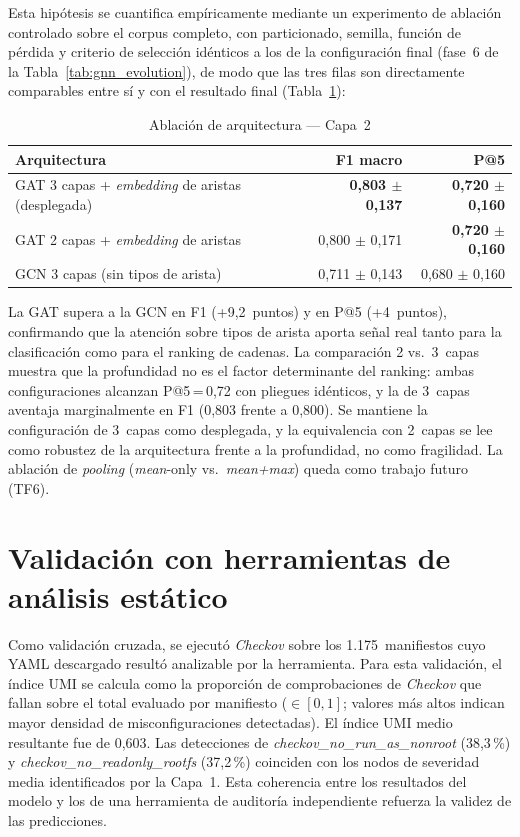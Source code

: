 Esta hipótesis se cuantifica empíricamente mediante un experimento de ablación
controlado sobre el corpus completo, con particionado, semilla, función de
pérdida y criterio de selección idénticos a los de la configuración final
(fase~6 de la Tabla~\ref{tab:gnn_evolution}), de modo que las tres filas son
directamente comparables entre sí y con el resultado final (Tabla~\ref{tab:arch_ablation}):

\begin{table}[htbp]
\centering
\caption{Ablación de arquitectura — Capa~2}
\label{tab:arch_ablation}
\begin{tabular}{@{}lrr@{}}
\toprule
Arquitectura & F1 macro & P@5 \\
\midrule
\ac{GAT} 3 capas + \textit{embedding} de aristas (desplegada)
  & \textbf{0,803 \(\pm\) 0,137} & \textbf{0,720 \(\pm\) 0,160} \\
\ac{GAT} 2 capas + \textit{embedding} de aristas
  & 0,800 \(\pm\) 0,171 & \textbf{0,720 \(\pm\) 0,160} \\
\ac{GCN} 3 capas (sin tipos de arista)
  & 0,711 \(\pm\) 0,143 & 0,680 \(\pm\) 0,160 \\
\bottomrule
\end{tabular}
\fuentepropia
\end{table}

La \ac{GAT} supera a la \ac{GCN} en F1 (+9,2~puntos) y en P@5 (+4~puntos),
confirmando que la atención sobre tipos de arista aporta señal real tanto para la
clasificación como para el ranking de cadenas. La comparación 2 vs.\ 3~capas
muestra que la profundidad no es el factor determinante del ranking: ambas
configuraciones alcanzan P@5\,=\,0,72 con pliegues idénticos, y la de 3~capas
aventaja marginalmente en F1 (0,803 frente a 0,800). Se mantiene la
configuración de 3~capas como desplegada, y la equivalencia con 2~capas se lee
como robustez de la arquitectura frente a la profundidad, no como fragilidad. La
ablación de \textit{pooling} (\textit{mean}-only vs.\ \textit{mean+max}) queda
como trabajo futuro (TF6).

\section{Validación con herramientas de análisis estático}

Como validación cruzada, se ejecutó \textit{Checkov} \citep{Checkov2021} sobre
los 1.175~manifiestos cuyo \acs{YAML} descargado resultó analizable por la
herramienta. Para esta validación, el índice \ac{UMI} se calcula como la
proporción de comprobaciones de \textit{Checkov} que fallan sobre el total
evaluado por manifiesto (\(\in [0,1]\); valores más altos indican mayor densidad
de misconfiguraciones detectadas). El índice \ac{UMI} medio resultante fue de
0,603.
Las detecciones de \textit{checkov\_no\_run\_as\_nonroot} (38,3\,\%) y
\textit{checkov\_no\_readonly\_rootfs} (37,2\,\%) coinciden con los nodos de
severidad media identificados por la Capa~1. Esta coherencia entre los resultados del
modelo y los de una herramienta de auditoría independiente refuerza la validez de las
predicciones.

